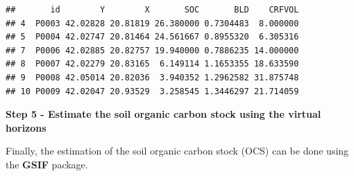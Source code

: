 \documentclass[10pt,b5paper,]{book}
\newenvironment{Shaded}{\begin{snugshade}}{\end{snugshade}}
\newcommand{\CommentTok}[1]{\textcolor[rgb]{0.56,0.35,0.01}{\textit{#1}}}
\newcommand{\DataTypeTok}[1]{\textcolor[rgb]{0.13,0.29,0.53}{#1}}
\newcommand{\DecValTok}[1]{\textcolor[rgb]{0.00,0.00,0.81}{#1}}
\newcommand{\KeywordTok}[1]{\textcolor[rgb]{0.13,0.29,0.53}{\textbf{#1}}}
\newcommand{\NormalTok}[1]{#1}
\newcommand{\OperatorTok}[1]{\textcolor[rgb]{0.81,0.36,0.00}{\textbf{#1}}}
\newcommand{\StringTok}[1]{\textcolor[rgb]{0.31,0.60,0.02}{#1}}
\theoremstyle{definition}
\theoremstyle{definition}
\theoremstyle{definition}
\theoremstyle{remark}
\begin{document}
\begin{verbatim}
##       id        Y        X       SOC       BLD    CRFVOL
## 4  P0003 42.02828 20.81819 26.380000 0.7304483  8.000000
## 5  P0004 42.02747 20.81464 24.561667 0.8955320  6.305316
## 7  P0006 42.02885 20.82757 19.940000 0.7886235 14.000000
## 8  P0007 42.02279 20.83165  6.149114 1.1653355 18.633590
## 9  P0008 42.05014 20.82036  3.940352 1.2962582 31.875748
## 10 P0009 42.02047 20.93529  3.258545 1.3446297 21.714059
\end{verbatim}

\textbf{Step 5 - Estimate the soil organic carbon stock using the
virtual horizons}

Finally, the estimation of the soil organic carbon stock (OCS) can be
done using the \textbf{GSIF} package.

\begin{Shaded}
\end{Shaded}
\end{document}
